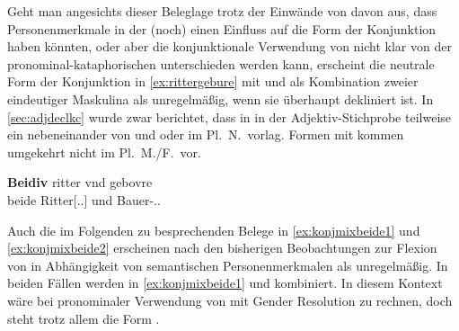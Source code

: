 Geht man angesichts dieser Beleglage trotz der Einwände von
\citet{gjelsten1980,ksw2} davon aus, dass Personenmerkmale in der
\KC{} (noch) einen Einfluss auf die Form der Konjunktion haben
könnten, oder aber die konjunktionale Verwendung von  nicht
klar von der pronominal-kataphorischen unterschieden werden kann, erscheint
die neutrale Form der Konjunktion in \cref{ex:rittergebure} mit 
 und   als Kombination zweier
eindeutiger Maskulina als unregelmäßig, wenn sie überhaupt dekliniert ist. In
\cref{sec:adjdeclkc} wurde zwar berichtet, dass in \citet{kc:VB} in der
Adjektiv-Stichprobe teilweise ein nebeneinander von  und 
oder  im Pl.~N.\ vorlag. Formen mit  kommen umgekehrt
nicht im Pl.~M./F.\ vor.

\begin{exe}
\ex\label{ex:rittergebure}
	\gll \textbf{Beidiv} ritter vnd gebovre \\
		beide Ritter[\Acc.\Pl.\MascM] und Bauer-\Acc.\Pl.\MascM{} \\
	\begin{taggedline}{\parencite[\pno~109\va, 29]{kc:VB}}
	\trans {}
	\end{taggedline}
\end{exe}

Auch die im Folgenden zu besprechenden Belege in \cref{ex:konjmixbeide1} und
\cref{ex:konjmixbeide2} erscheinen nach den bisherigen Beobachtungen zur
Flexion von  in Abhängigkeit von semantischen Personenmerkmalen
als unregelmäßig. In beiden Fällen werden in \cref{ex:konjmixbeide1}
 und  kombiniert. In diesem Kontext wäre bei pronominaler
Verwendung von  mit Gender Resolution zu rechnen, doch steht
trotz allem die Form .

